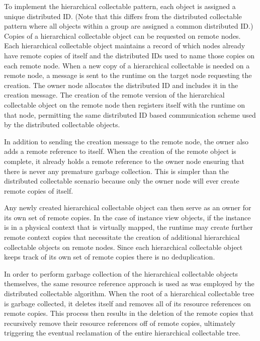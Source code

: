 To implement the hierarchical collectable pattern,
each object is assigned a unique distributed ID.
(Note that this differs from the distributed collectable
pattern where all objects within a group are assigned
a common distributed ID.)  Copies of a hierarchical
collectable object can be requested on remote nodes.
Each hierarchical collectable object maintains a 
record of which nodes already have remote copies of
itself and the distributed IDs used to name those
copies on each remote node. When a new copy of a hierarchical
collectable is needed on a remote node, a message is sent
to the runtime on the target node requesting the
creation. The owner node allocates the distributed
ID and includes it in the creation message. The
creation of the remote version of the hierarchical
collectable object on the remote node then registers
itself with the runtime on that node, permitting the
same distributed ID based communication scheme used
by the distributed collectable objects.

In addition to sending the creation message to the
remote node, the owner also adds a remote reference 
to itself.  When the creation of the remote object
is complete, it already holds a remote reference to
the owner node ensuring that there is never any
premature garbage collection. This is 
simpler than the distributed collectable scenario
because only the owner node will ever create remote
copies of itself.

Any newly created hierarchical collectable object can 
then serve as an owner for its own set of remote copies. 
In the case of instance view objects, if the instance is 
in a physical context that is virtually
mapped, the runtime may create further remote
context copies that necessitate the creation of
additional hierarchical collectable objects on 
remote nodes. Since each hierarchical collectable
object keeps track of its own set of remote copies
there is no deduplication.

In order to perform garbage collection of the 
hierarchical collectable objects themselves, the
same resource reference approach is used as was
employed by the distributed collectable algorithm.
When the root of a hierarchical collectable tree
is garbage collected, it deletes itself and removes
all of its resource references on remote copies.
This process then results in the deletion of the
remote copies that recursively remove their 
resource references off of remote copies, ultimately
triggering the eventual reclamation of the entire
hierarchical collectable tree.


